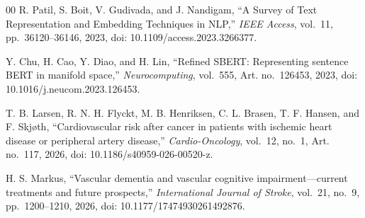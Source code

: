 \documentclass[a4paper,fleqn]{cas-dc}
\begin{document}
\begin{thebibliography}{00}
 R. Patil, S. Boit, V. Gudivada, and J. Nandigam, ``A Survey of Text Representation and Embedding Techniques in NLP,'' \textit{IEEE Access}, vol.~11, pp.~36120--36146, 2023, doi: 10.1109/access.2023.3266377.

 Y. Chu, H. Cao, Y. Diao, and H. Lin, ``Refined SBERT: Representing sentence BERT in manifold space,'' \textit{Neurocomputing}, vol.~555, Art. no.~126453, 2023, doi: 10.1016/j.neucom.2023.126453.

 T. B. Larsen, R. N. H. Flyckt, M. B. Henriksen, C. L. Brasen, T. F. Hansen, and F. Skjøth, ``Cardiovascular risk after cancer in patients with ischemic heart disease or peripheral artery disease,'' \textit{Cardio-Oncology}, vol.~12, no.~1, Art. no.~117, 2026, doi: 10.1186/s40959-026-00520-z.

 H. S. Markus, ``Vascular dementia and vascular cognitive impairment—current treatments and future prospects,'' \textit{International Journal of Stroke}, vol.~21, no.~9, pp.~1200--1210, 2026, doi: 10.1177/17474930261492876.
\end{thebibliography}
\end{document}
